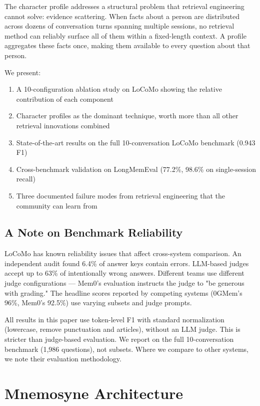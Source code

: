 \documentclass[11pt]{article}
\begin{document}
The character profile addresses a structural problem that retrieval engineering cannot solve: evidence scattering. When facts about a person are distributed across dozens of conversation turns spanning multiple sessions, no retrieval method can reliably surface all of them within a fixed-length context. A profile aggregates these facts once, making them available to every question about that person.

We present:

\begin{enumerate}
  \item A 10-configuration ablation study on LoCoMo showing the relative contribution of each component
  \item Character profiles as the dominant technique, worth more than all other retrieval innovations combined
  \item State-of-the-art results on the full 10-conversation LoCoMo benchmark (0.943 F1)
  \item Cross-benchmark validation on LongMemEval (77.2\%, 98.6\% on single-session recall)
  \item Three documented failure modes from retrieval engineering that the community can learn from
\end{enumerate}


\subsection{A Note on Benchmark Reliability}

LoCoMo has known reliability issues that affect cross-system comparison. An independent audit found 6.4\% of answer keys contain errors. LLM-based judges accept up to 63\% of intentionally wrong answers. Different teams use different judge configurations --- Mem0's evaluation instructs the judge to "be generous with grading." The headline scores reported by competing systems (0GMem's 96\%, Mem0's 92.5\%) use varying subsets and judge prompts.

All results in this paper use token-level F1 with standard normalization (lowercase, remove punctuation and articles), without an LLM judge. This is stricter than judge-based evaluation. We report on the full 10-conversation benchmark (1,986 questions), not subsets. Where we compare to other systems, we note their evaluation methodology.



\section{Mnemosyne Architecture}
\end{document}
